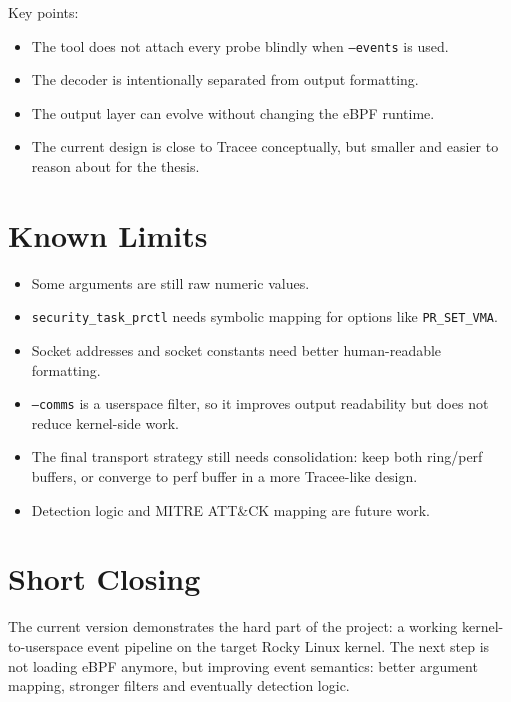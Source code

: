 \documentclass[11pt,a4paper]{article}
\begin{document}
Key points:

\begin{itemize}
  \item The tool does not attach every probe blindly when \texttt{--events} is used.
  \item The decoder is intentionally separated from output formatting.
  \item The output layer can evolve without changing the eBPF runtime.
  \item The current design is close to Tracee conceptually, but smaller and easier to reason about for the thesis.
\end{itemize}

\section{Known Limits}

\begin{itemize}
  \item Some arguments are still raw numeric values.
  \item \texttt{security\_task\_prctl} needs symbolic mapping for options like \texttt{PR\_SET\_VMA}.
  \item Socket addresses and socket constants need better human-readable formatting.
  \item \texttt{--comms} is a userspace filter, so it improves output readability but does not reduce kernel-side work.
  \item The final transport strategy still needs consolidation: keep both ring/perf buffers, or converge to perf buffer in a more Tracee-like design.
  \item Detection logic and MITRE ATT\&CK mapping are future work.
\end{itemize}

\section{Short Closing}

The current version demonstrates the hard part of the project: a working
kernel-to-userspace event pipeline on the target Rocky Linux kernel. The next
step is not loading eBPF anymore, but improving event semantics: better
argument mapping, stronger filters and eventually detection logic.
\end{document}
